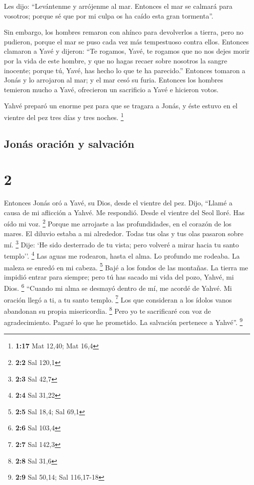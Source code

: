  Les dijo: ``Levántenme y arrójenme al mar. Entonces el
mar se calmará para vosotros; porque sé que por mi culpa os ha caído
esta gran tormenta''.

 Sin embargo, los hombres remaron con ahínco para
devolverlos a tierra, pero no pudieron, porque el mar se puso cada vez
más tempestuoso contra ellos.  Entonces clamaron a Yavé y
dijeron: ``Te rogamos, Yavé, te rogamos que no nos dejes morir por la
vida de este hombre, y que no hagas recaer sobre nosotros la sangre
inocente; porque tú, Yavé, has hecho lo que te ha parecido.''
 Entonces tomaron a Jonás y lo arrojaron al mar; y el mar
cesó su furia.  Entonces los hombres temieron mucho a
Yavé, ofrecieron un sacrificio a Yavé e hicieron votos.

 Yahvé preparó un enorme pez para que se tragara a Jonás,
y éste estuvo en el vientre del pez tres días y tres noches. \footnote{\textbf{1:17}
  Mat 12,40; Mat 16,4}

\hypertarget{jonuxe1s-oraciuxf3n-y-salvaciuxf3n}{%
\subsection{Jonás oración y
salvación}\label{jonuxe1s-oraciuxf3n-y-salvaciuxf3n}}

\hypertarget{section-1}{%
\section{2}\label{section-1}}

 Entonces Jonás oró a Yavé, su Dios, desde el vientre del
pez.  Dijo, ``Llamé a causa de mi aflicción a Yahvé. Me
respondió. Desde el vientre del Seol lloré. Has oído mi voz. \footnote{\textbf{2:2}
  Sal 120,1}  Porque me arrojaste a las profundidades, en
el corazón de los mares. El diluvio estaba a mi alrededor. Todas tus
olas y tus olas pasaron sobre mí. \footnote{\textbf{2:3} Sal 42,7}
 Dije: `He sido desterrado de tu vista; pero volveré a
mirar hacia tu santo templo''. \footnote{\textbf{2:4} Sal 31,22}
 Las aguas me rodearon, hasta el alma. Lo profundo me
rodeaba. La maleza se enredó en mi cabeza. \footnote{\textbf{2:5} Sal
  18,4; Sal 69,1}  Bajé a los fondos de las montañas. La
tierra me impidió entrar para siempre; pero tú has sacado mi vida del
pozo, Yahvé, mi Dios. \footnote{\textbf{2:6} Sal 103,4} 
``Cuando mi alma se desmayó dentro de mí, me acordé de Yahvé. Mi oración
llegó a ti, a tu santo templo. \footnote{\textbf{2:7} Sal 142,3}
 Los que consideran a los ídolos vanos abandonan su propia
misericordia. \footnote{\textbf{2:8} Sal 31,6}  Pero yo te
sacrificaré con voz de agradecimiento. Pagaré lo que he prometido. La
salvación pertenece a Yahvé''. \footnote{\textbf{2:9} Sal 50,14; Sal
  116,17-18}

